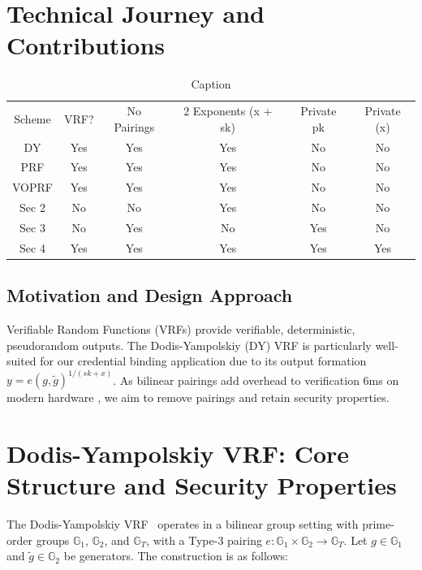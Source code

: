 \section{Technical Journey and Contributions}


\begin{table}
    \centering
    \begin{tabular}{cccccc}
       Scheme  & VRF?     & No Pairings  & 2 Exponents (x + sk)  & Private pk & Private (x) \\
       DY      & Yes     & Yes           & Yes                   & No         & No \\
       PRF      & Yes     & Yes           & Yes                   & No         & No \\
       VOPRF      & Yes     & Yes           & Yes                   & No         & No \\
       Sec 2   & No     & No            & Yes                   & No         & No \\
       Sec 3   & No     & Yes           & No                    & Yes        & No \\
       Sec 4   & Yes     & Yes           & Yes                   & Yes        & Yes\\
    \end{tabular}
    \caption{Caption}
    \label{tab:my_label}
\end{table}

\subsection{Motivation and Design Approach}
Verifiable Random Functions (VRFs) provide verifiable, deterministic, pseudorandom outputs. The Dodis-Yampolskiy (DY) VRF \cite{hutchison_verifiable_2005} is particularly well-suited for our credential binding application due to its output formation $y = e(g,\tilde{g})^{1/(sk+x)}$. As bilinear pairings add overhead to verification  6ms on modern hardware \cite{polgar_anonymous_2025}, we aim to remove pairings and retain security properties. 

\section{Dodis-Yampolskiy VRF: Core Structure and Security Properties}

The Dodis-Yampolskiy VRF~\cite{hutchison_verifiable_2005} operates in a bilinear group setting with prime-order groups $\mathbb{G}_1$, $\mathbb{G}_2$, and $\mathbb{G}_T$, with a Type-3 pairing $e: \mathbb{G}_1 \times \mathbb{G}_2 \rightarrow \mathbb{G}_T$. Let $g \in \mathbb{G}_1$ and $\tilde{g} \in \mathbb{G}_2$ be generators. The construction is as follows:

